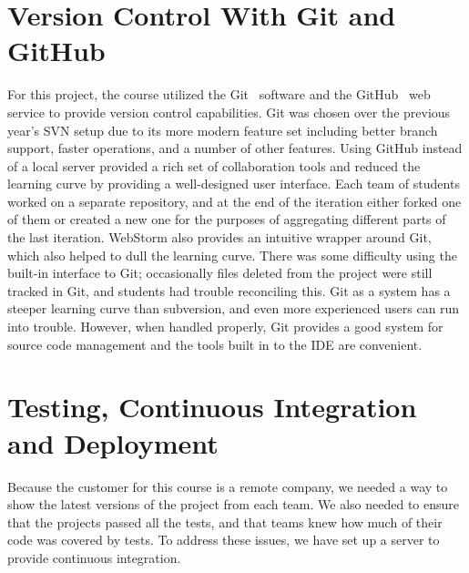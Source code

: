 \documentclass[12pt]{article}
\begin{document}
\section{Version Control With Git and GitHub}\label{sec:git}
For this project, the course utilized the Git~\cite{Git} software and the GitHub~\cite{GitHub} web service to provide version control capabilities. 
Git was chosen over the previous year's SVN setup due to its more modern feature set including better branch support, faster operations, and a number of other features. 
Using GitHub instead of a local server provided a rich set of collaboration tools and reduced the learning curve by providing a well-designed user interface. 
Each team of students worked on a separate repository, and at the end of the iteration either forked one of them or created a new one for the purposes of aggregating different parts of the last iteration. 
WebStorm also provides an intuitive wrapper around Git, which also helped to dull the learning curve. 
There was some difficulty using the built-in interface to Git; occasionally files deleted from the project were still tracked in Git, and students had trouble reconciling this. 
Git as a system has a steeper learning curve than subversion, and even more experienced users can run into trouble. 
However, when handled properly, Git provides a good system for source code management and the tools built in to the IDE are convenient.


\section{Testing, Continuous Integration and Deployment}\label{sec:CI}
Because the customer for this course is a remote company, we needed a way to show the latest versions of the project from each team. 
We also needed to ensure that the projects passed all the tests, and that teams knew how much of their code was covered by tests. 
To address these issues, we have set up a server to provide continuous integration.
\end{document}
